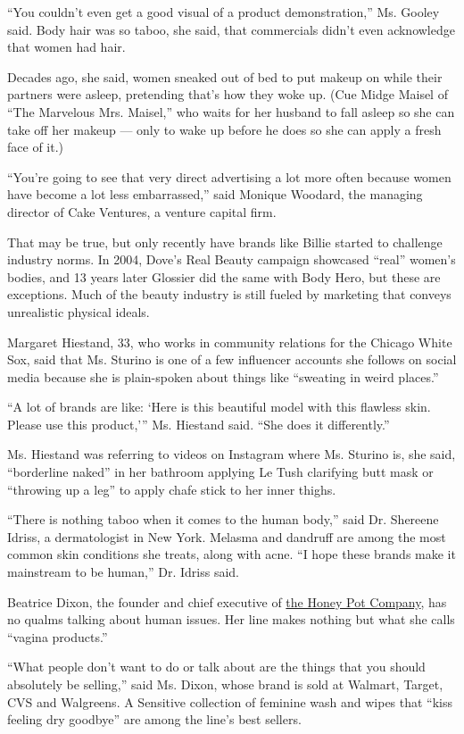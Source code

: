 ``You couldn't even get a good visual of a product demonstration,'' Ms.
Gooley said. Body hair was so taboo, she said, that commercials didn't
even acknowledge that women had hair.

Decades ago, she said, women sneaked out of bed to put makeup on while
their partners were asleep, pretending that's how they woke up. (Cue
Midge Maisel of ``The Marvelous Mrs. Maisel,'' who waits for her husband
to fall asleep so she can take off her makeup --- only to wake up before
he does so she can apply a fresh face of it.)

``You're going to see that very direct advertising a lot more often
because women have become a lot less embarrassed,'' said Monique
Woodard, the managing director of Cake Ventures, a venture capital firm.

That may be true, but only recently have brands like Billie started to
challenge industry norms. In 2004, Dove's Real Beauty campaign showcased
``real'' women's bodies, and 13 years later Glossier did the same with
Body Hero, but these are exceptions. Much of the beauty industry is
still fueled by marketing that conveys unrealistic physical ideals.

Margaret Hiestand, 33, who works in community relations for the Chicago
White Sox, said that Ms. Sturino is one of a few influencer accounts she
follows on social media because she is plain-spoken about things like
``sweating in weird places.''

``A lot of brands are like: `Here is this beautiful model with this
flawless skin. Please use this product,''' Ms. Hiestand said. ``She does
it differently.''

Ms. Hiestand was referring to videos on Instagram where Ms. Sturino is,
she said, ``borderline naked'' in her bathroom applying Le Tush
clarifying butt mask or ``throwing up a leg'' to apply chafe stick to
her inner thighs.

``There is nothing taboo when it comes to the human body,'' said Dr.
Shereene Idriss, a dermatologist in New York. Melasma and dandruff are
among the most common skin conditions she treats, along with acne. ``I
hope these brands make it mainstream to be human,'' Dr. Idriss said.

Beatrice Dixon, the founder and chief executive of
\href{https://thehoneypot.co/}{the Honey Pot Company}, has no qualms
talking about human issues. Her line makes nothing but what she calls
``vagina products.''

``What people don't want to do or talk about are the things that you
should absolutely be selling,'' said Ms. Dixon, whose brand is sold at
Walmart, Target, CVS and Walgreens. A Sensitive collection of feminine
wash and wipes that ``kiss feeling dry goodbye'' are among the line's
best sellers.

